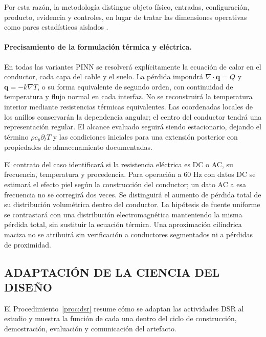 \documentclass[11pt,a4paper,oneside]{report}
\begin{document}
Por esta razón, la metodología distingue objeto físico, entradas, configuración, producto, evidencia y controles, en lugar de tratar las dimensiones operativas como pares estadísticos aislados \parencites[55--56]{peffers2007}[342--344]{gregor2013}.

\paragraph{Precisamiento de la formulación térmica y eléctrica.}
En todas las variantes PINN se resolverá explícitamente la ecuación de calor
en el conductor, cada capa del cable y el suelo. La pérdida impondrá
$\nabla\!\cdot\mathbf q=Q$ y $\mathbf q=-k\nabla T$, o su forma equivalente
de segundo orden, con continuidad de temperatura y flujo normal en cada
interfaz. No se reconstruirá la temperatura interior mediante resistencias
térmicas equivalentes. Las coordenadas locales de los anillos conservarán
la dependencia angular; el centro del conductor tendrá una representación
regular. El alcance evaluado seguirá siendo estacionario, dejando el término
$\rho c_p\partial_t T$ y las condiciones iniciales para una extensión posterior
con propiedades de almacenamiento documentadas.

El contrato del caso identificará si la resistencia eléctrica es DC o AC,
su frecuencia, temperatura y procedencia. Para operación a 60 Hz con datos
DC se estimará el efecto piel según la construcción del conductor; un dato
AC a esa frecuencia no se corregirá dos veces. Se distinguirá el aumento
de pérdida total de su distribución volumétrica dentro del conductor.
La hipótesis de fuente uniforme se contrastará con una distribución
electromagnética manteniendo la misma pérdida total, sin sustituir la
ecuación térmica. Una aproximación cilíndrica maciza no se atribuirá sin
verificación a conductores segmentados ni a pérdidas de proximidad.

\subsection{ADAPTACIÓN DE LA CIENCIA DEL DISEÑO}

El Procedimiento~\ref{proc:dsr} resume cómo se adaptan las actividades DSR al estudio y muestra la función de cada una dentro del ciclo de construcción, demostración, evaluación y comunicación del artefacto.
\end{document}

